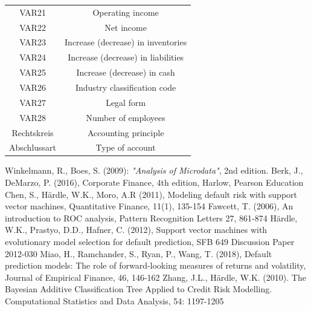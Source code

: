 \documentclass{article}
\begin{document}
\begin{table}
\begin{tabular}{cc}
VAR21 & Operating income\\
VAR22 & Net income\\
VAR23 & Increase (decrease) in inventories\\
VAR24 & Increase (decrease) in liabilities\\
VAR25 & Increase (decrease) in cash\\
VAR26 & Industry classification code\\
VAR27 & Legal form\\
VAR28 & Number of employees\\
Rechtskreis & Accounting principle\\
Abschlussart & Type of account\\
\hline\hline
\end{tabular}
\end{table}


\begin{thebibliography}{9}
  Winkelmann, R., Boes, S. (2009): \textit{"Analysis of Microdata"}, 2nd edition.
  Berk, J., DeMarzo, P. (2016), Corporate Finance, 4th edition, Harlow, Pearson Education 
  Chen, S., H{\"a}rdle, W.K., Moro, A.R (2011), Modeling default risk with support vector machines,  Quantitative Finance, 11(1), 135-154
  Fawcett, T. (2006), An introduction to ROC analysis, Pattern Recognition Letters 27, 861-874
  H{\"a}rdle, W.K., Prastyo, D.D., Hafner, C. (2012), Support vector machines with evolutionary model selection for default prediction, SFB 649 Discussion Paper 2012-030
  Miao, H., Ramchander, S., Ryan, P., Wang, T. (2018), Default prediction models: The role of forward-looking measures of returns and volatility, Journal of Empirical Finance, 46, 146-162
  Zhang, J.L., H{\"a}rdle, W.K. (2010). The Bayesian Additive Classification Tree Applied to Credit Risk Modelling. Computational Statistics and Data Analysis, 54: 1197-1205 
\end{thebibliography}
\end{document}
